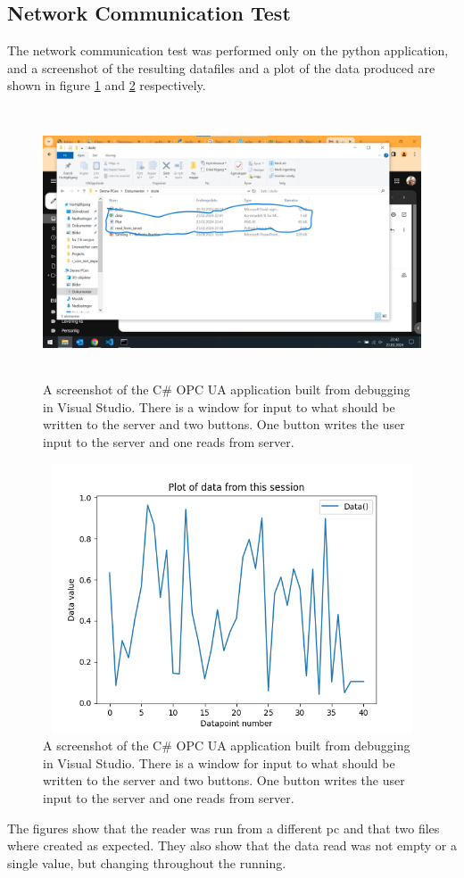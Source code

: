 \documentclass[11pt, A4paper, english]{article}
\begin{document}
		\subsection{Network Communication Test}
The network communication test was performed only on the python application, and a screenshot of the resulting datafiles and a plot of the data produced are shown in figure \ref{im:N_S} and \ref{im:N_D} respectively. \\
			\begin{figure}[H]
\includegraphics[width=12.8cm, height=8cm]{Skjermbilde 2024-02-23 224305.png}
\caption{A screenshot of the C\# OPC UA application built from debugging in Visual Studio. There is a window for input to what should be written to the server and two buttons. One button writes the user input to the server and one reads from server.}
\label{im:N_S}
			\end{figure}
			\begin{figure}[H]
\includegraphics[width=12.8cm, height=8cm]{Plot.png}
\caption{A screenshot of the C\# OPC UA application built from debugging in Visual Studio. There is a window for input to what should be written to the server and two buttons. One button writes the user input to the server and one reads from server.}
\label{im:N_D}
			\end{figure}
The figures show that the reader was run from a different pc and that two files where created as expected. They also show that the data read was not empty or a single value, but changing throughout the running.
\end{document}
